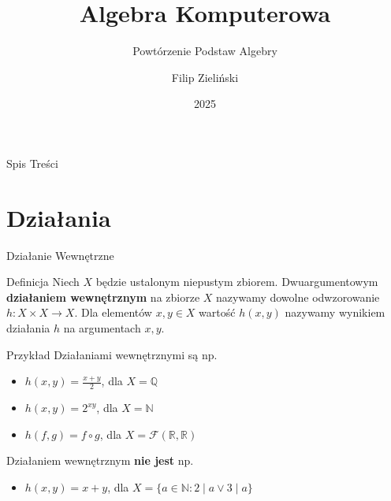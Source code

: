 \documentclass{beamer}
\title{Algebra Komputerowa}
\subtitle{Powtórzenie Podstaw Algebry}
\author{Filip Zieli\'nski}
\date{2025}
\begin{document}
\begin{frame}
    \titlepage
\end{frame}
 
\begin{frame}{Spis Treści}
    \tableofcontents
\end{frame}

\section{Działania}
\begin{frame}{Działanie Wewnętrzne}
    \begin{block}{Definicja}
        Niech $X$ będzie ustalonym niepustym zbiorem. Dwuargumentowym \textbf{działaniem wewnętrznym} na zbiorze $X$ nazywamy  dowolne odwzorowanie $h: X \times X \rightarrow X$.
        Dla elementów $x,y \in X$ wartość $h(x,y)$ nazywamy wynikiem działania $h$ na argumentach $x,y$. 
    \end{block}
    \pause 
    \begin{exampleblock}{Przykład}
        Działaniami wewnętrznymi są np. 
        \begin{itemize}
            \item  $h(x,y) = \frac{x+y}{2}$, dla $X = \mathbb{Q}$ 
            \item $h(x,y) = 2^{xy}$, dla $X = \mathbb{N}$ 
            \item $h(f,g) =  f \circ g $, dla $ X = \mathcal{F}(\mathbb{R}, \mathbb{R})$
        \end{itemize}
        Działaniem wewnętrznym \textbf{nie jest} np. 
        \begin{itemize}
            \item $h(x,y) = x + y$, dla $X = \{ a \in \mathbb{N} : 2\mid a \lor 3\mid a \}$
        \end{itemize}
        
    \end{exampleblock}
\end{frame}
\end{document}
